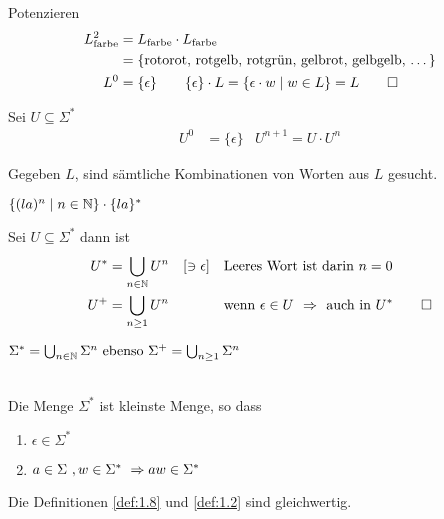 Potenzieren
\begin{align*}
	L_\text{farbe}^2 &= L_\text{farbe}\cdot L_\text{farbe}\\
	&= \{ \text{rotorot, rotgelb, rotgrün, gelbrot, gelbgelb, \dots} \}\\
	L^0 &=\{\epsilon\} \qquad \{\epsilon\}\cdot L = \{\epsilon\cdot w \mid w\in L\} = L \qedhere
\end{align*}
%
\begin{Def} Sei $U\subseteq\Sigma^*$
	\begin{align*}
		U^0 &= \{\epsilon\} & U^{n+1}= U \cdot U^n
	\end{align*}
\end{Def}
Gegeben $L$, sind sämtliche Kombinationen von Worten aus $L$ gesucht.
\begin{Bsp*}
	$\{(la)^n \mid n\in\mathbb{N}\}\cdot\{la\}^*$
\end{Bsp*}
\vspace{.5em}
\begin{Def}
	Sei $U\subseteq\Sigma^*$ dann ist
	\begin{align*}
		U^* &= \bigcup_{n\in\N} U^n \quad [\ni\epsilon] && \text{Leeres Wort ist darin }n=0\\
		U^+ &= \bigcup_{n\ge1} U^n && \text{wenn $\epsilon\in U$ \=> auch in $U^*$} \qedhere
	\end{align*}
\end{Def}
\begin{Bemerkung}
	$\Sigma^*=\bigcup_{n\in\mathbb{N}}\Sigma^n \text{ ebenso } \Sigma^+ = \bigcup_{n\ge1}\Sigma^n$
\end{Bemerkung}
\begin{Def}\label{def:1.8}\ \\
	Die Menge $\Sigma^*$ ist kleinste Menge, so dass
	\begin{enumerate}[label={(\arabic*)}]
		\item $\epsilon\in\Sigma^*$
		\item\label{def:1.8.2} $a\in\Sigma\ ,w\in\Sigma^*\ \=> aw\in\Sigma^*$\qedhere
	\end{enumerate}
\end{Def}
Die Definitionen \ref{def:1.8} und \ref{def:1.2} sind gleichwertig.
